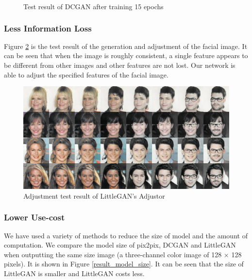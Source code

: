 \begin{figure}
\begin{minipage}[t]{0.48\linewidth}
            \caption{Test result of DCGAN after training 15 epochs}
            \label{dcgan_e15}
        \end{minipage}
    \end{figure}

\subsubsection*{Less Information Loss}
Figure \ref{adjust} is the test result of the generation and adjustment of the facial image.
It can be seen that when the image is roughly consistent, a single feature appears to be different from other images and other features are not lost.
Our network is able to adjust the specified features of the facial image.
    
        \begin{figure}
            \begin{center}
            \includegraphics[width=\textwidth]{figures/result_adjust.png}
            \caption{Adjustment test result of LittleGAN's Adjustor}
            \label{adjust}
            \end{center}
        \end{figure}

\subsubsection*{Lower Use-cost}
We have used a variety of methods to reduce the size of model and the amount of computation.
We compare the model size of pix2pix, DCGAN and LittleGAN when outputting the same size image (a three-channel color image of 128 × 128 pixels).
It is shown in Figure \ref{result_model_size}.
It can be seen that the size of LittleGAN is smaller and LittleGAN costs less.

